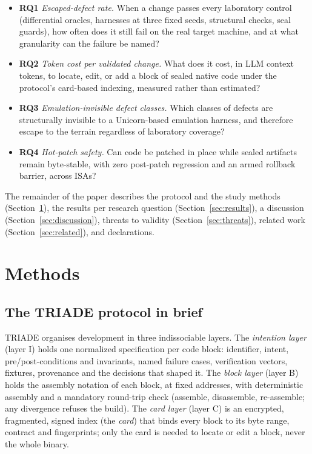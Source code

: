 \documentclass[11pt,a4paper]{article}
\newcommand{\RQ}[1]{\textbf{RQ#1}}
\begin{document}
\begin{itemize}
\item \RQ{1} \emph{Escaped-defect rate.} When a change passes every
laboratory control (differential oracles, harnesses at three fixed seeds,
structural checks, seal guards), how often does it still fail on the real
target machine, and at what granularity can the failure be named?
\item \RQ{2} \emph{Token cost per validated change.} What does it cost,
in LLM context tokens, to locate, edit, or add a block of sealed native
code under the protocol's card-based indexing, measured rather than
estimated?
\item \RQ{3} \emph{Emulation-invisible defect classes.} Which classes of
defects are structurally invisible to a Unicorn-based emulation harness,
and therefore escape to the terrain regardless of laboratory coverage?
\item \RQ{4} \emph{Hot-patch safety.} Can code be patched in place while
sealed artifacts remain byte-stable, with zero post-patch regression and
an armed rollback barrier, across ISAs?
\end{itemize}

The remainder of the paper describes the protocol and the study methods
(Section~\ref{sec:methods}), the results per research question
(Section~\ref{sec:results}), a discussion (Section~\ref{sec:discussion}),
threats to validity (Section~\ref{sec:threats}), related work
(Section~\ref{sec:related}), and declarations.

\section{Methods}\label{sec:methods}

\subsection{The TRIADE protocol in brief}\label{sec:protocole}

TRIADE organises development in three indissociable layers. The
\emph{intention layer} (layer I) holds one normalized specification per
code block: identifier, intent, pre/post-conditions and invariants, named
failure cases, verification vectors, fixtures, provenance and the
decisions that shaped it. The \emph{block layer} (layer B) holds the
assembly notation of each block, at fixed addresses, with deterministic
assembly and a mandatory round-trip check (assemble, disassemble,
re-assemble; any divergence refuses the build). The \emph{card layer}
(layer C) is an encrypted, fragmented, signed index (the \emph{card}) that
binds every block to its byte range, contract and fingerprints; only the
card is needed to locate or edit a block, never the whole binary.
\end{document}
